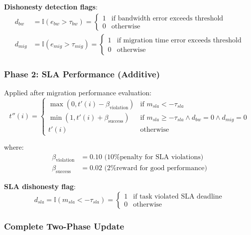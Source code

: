 \documentclass[12pt,a4paper]{article}
\begin{document}
\textbf{Dishonesty detection flags}:
\begin{align}
    d_{bw} &= \mathbb{I}(e_{bw} > \tau_{bw}) = \begin{cases} 1 & \text{if bandwidth error exceeds threshold} \\ 0 & \text{otherwise} \end{cases} \\
    d_{mig} &= \mathbb{I}(e_{mig} > \tau_{mig}) = \begin{cases} 1 & \text{if migration time error exceeds threshold} \\ 0 & \text{otherwise} \end{cases}
\end{align}

\subsubsection{Phase 2: SLA Performance (Additive)}

Applied after migration performance evaluation:
\begin{equation}
    t''(i) = \begin{cases}
        \max(0, t'(i) - \beta_{\text{violation}}) & \text{if } m_{sla} < -\tau_{sla} \\
        \min(1, t'(i) + \beta_{\text{success}}) & \text{if } m_{sla} \geq -\tau_{sla} \land d_{bw} = 0 \land d_{mig} = 0 \\
        t'(i) & \text{otherwise}
    \end{cases}
\end{equation}

where:
\begin{align}
    \beta_{\text{violation}} &= 0.10 \text{ (10\% penalty for SLA violations)} \\
    \beta_{\text{success}} &= 0.02 \text{ (2\% reward for good performance)}
\end{align}

\textbf{SLA dishonesty flag}:
\begin{equation}
    d_{sla} = \mathbb{I}(m_{sla} < -\tau_{sla}) = \begin{cases} 1 & \text{if task violated SLA deadline} \\ 0 & \text{otherwise} \end{cases}
\end{equation}

\subsubsection{Complete Two-Phase Update}
\end{document}

